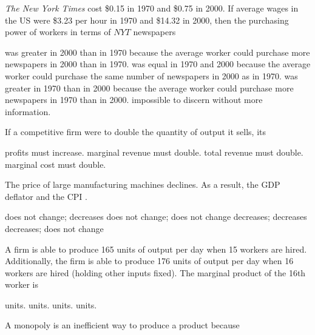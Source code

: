 \documentclass[addpoints,11pt]{exam}
\theoremstyle{definition}
\newcommand{\blank}[0]{\underline{\hspace{3cm}}}
\begin{document}
\begin{questions}
\begin{choices}
\end{choices}

\newpage	

	\question \textit{The New York Times} cost \$0.15 in 1970 and \$0.75 in 2000. If average wages in the US were \$3.23 per hour in 1970 and \$14.32 in 2000, then the purchasing power of workers in terms of $NYT$ newspapers 

\begin{choices}
	\choice was greater in 2000 than in 1970 because the average worker could purchase more newspapers in 2000 than in 1970.
	\choice was equal in 1970 and 2000 because the average worker could purchase the same number of newspapers in 2000 as in 1970.
	\CorrectChoice was greater in 1970 than in 2000 because the average worker could purchase more newspapers in 1970 than in 2000.
	\choice impossible to discern without more information.
\end{choices}

\question If a competitive firm were to double the quantity of output it sells, its

\begin{choices}
	\choice profits must increase.
	\choice marginal revenue must double.
	\CorrectChoice total revenue must double.
	\choice marginal cost must double.
\end{choices}


\question The price of large manufacturing machines declines. As a result, the GDP deflator \blank and the CPI \blank.

\begin{choices}
	\choice does not change; decreases
	\choice does not change; does not change
	\choice decreases; decreases
	\CorrectChoice decreases; does not change
\end{choices}

\question A firm is able to produce 165 units of output per day when 15 workers are hired. Additionally, the firm is able to produce 176 units of output per day when 16 workers are hired (holding other inputs fixed). The marginal product of the 16th worker is

\begin{choices}
	 units.
	 units.
	 units.
	 units.
\end{choices}


\question A monopoly is an inefficient way to produce a product because 


\end{questions}
\end{document}
